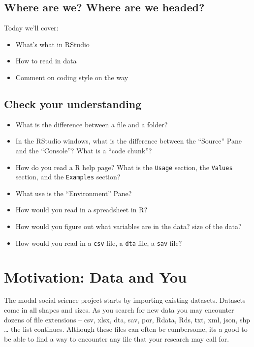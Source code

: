 \documentclass[]{book}
\providecommand{\tightlist}{%
  \setlength{\itemsep}{0pt}\setlength{\parskip}{0pt}}
\theoremstyle{definition}
\theoremstyle{definition}
\theoremstyle{definition}
\theoremstyle{remark}
\begin{document}
\subsection*{Where are we? Where are we
headed?}\label{where-are-we-where-are-we-headed}

Today we'll cover:

\begin{itemize}
\tightlist
\item
  What's what in RStudio
\item
  How to read in data
\item
  Comment on coding style on the way
\end{itemize}

\subsection*{Check your understanding}\label{check-your-understanding}

\begin{itemize}
\tightlist
\item
  What is the difference between a file and a folder?
\item
  In the RStudio windows, what is the difference between the ``Source''
  Pane and the ``Console''? What is a ``code chunk''?
\item
  How do you read a R help page? What is the \texttt{Usage} section, the
  \texttt{Values} section, and the \texttt{Examples} section?
\item
  What use is the ``Environment'' Pane?
\item
  How would you read in a spreadsheet in R?
\item
  How would you figure out what variables are in the data? size of the
  data?
\item
  How would you read in a \texttt{csv} file, a \texttt{dta} file, a
  \texttt{sav} file?
\end{itemize}

\section{Motivation: Data and You}\label{motivation-data-and-you}

The modal social science project starts by importing existing datasets.
Datasets come in all shapes and sizes. As you search for new data you
may encounter dozens of file extensions -- csv, xlsx, dta, sav, por,
Rdata, Rds, txt, xml, json, shp \ldots{} the list continues. Although
these files can often be cumbersome, its a good to be able to find a way
to encounter any file that your research may call for.
\end{document}
